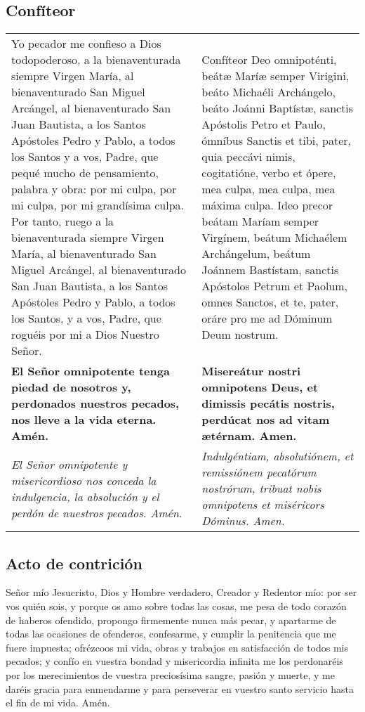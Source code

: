 \documentclass[./devocionario.tex]{subfiles}
\begin{document}
    \subsection*{Confíteor}
    \begin{longtable} { p{} p{} }
        Yo pecador me confieso a Dios todopoderoso, a la bienaventurada siempre Virgen María, al bienaventurado San Miguel Arcángel, 
        al bienaventurado San Juan Bautista, a los Santos Apóstoles Pedro y Pablo, a todos los Santos y a vos, Padre, que pequé mucho 
        de pensamiento, palabra y obra: por mi culpa, por mi culpa, por mi grandísima culpa. Por tanto, ruego a la bienaventurada 
        siempre Virgen María, al bienaventurado San Miguel Arcángel, al bienaventurado San Juan Bautista, a los Santos Apóstoles 
        Pedro y Pablo, a todos los Santos, y a vos, Padre, que roguéis por mi a Dios Nuestro Señor.
        
        &

        Confíteor Deo omnipoténti, beátæ Maríæ semper Virigini, beáto Michaéli Archángelo, beáto Joánni Baptístæ, sanctis Apóstolis Petro et Paulo, 
        ómníbus Sanctis et tibi, pater, quia peccávi nimis, cogitatióne, verbo et ópere, mea culpa, mea culpa, mea máxima culpa. Ideo precor beátam 
        Maríam semper Virgínem, beátum Michaélem Archángelum, beátum Joánnem Bastístam, sanctis Apóstolos Petrum et Paolum, omnes Sanctos, et te, pater, 
        oráre pro me ad Dóminum Deum nostrum.\\

        \textbf{El Señor omnipotente tenga piedad de nosotros y, perdonados nuestros pecados, nos lleve a la vida eterna. Amén.}

        &

        \textbf{Misereátur nostri omnipotens Deus, et dimissis pecátis nostris, perdúcat nos ad vitam ætérnam. Amen.}\\

        \textit{El Señor omnipotente y misericordioso nos conceda la indulgencia, la absolución y el perdón de nuestros pecados. Amén.}

        &

        \textit{Indulgéntiam, absolutiónem, et remissiónem pecatórum nostrórum, tribuat nobis omnipotens et miséricors Dóminus. Amen.}
    \end{longtable}

    \subsection*{Acto de contrición}
    Señor mío Jesucristo, Dios y Hombre verdadero, Creador y Redentor mío: por ser vos quién sois, y porque os amo sobre todas las cosas, 
    me pesa de todo corazón de haberos ofendido, propongo firmemente nunca más pecar, y apartarme de todas las ocasiones de ofenderos, 
    confesarme, y cumplir la penitencia que me fuere impuesta; ofrézcoos mi vida, obras y trabajos en satisfacción de todos mis pecados; 
    y confío en vuestra bondad y misericordia infinita me los perdonaréis por los merecimientos de vuestra preciosísima sangre, pasión y muerte, 
    y me daréis gracia para enmendarme y para perseverar en vuestro santo servicio hasta el fin de mi vida. Amén.
\end{document}
